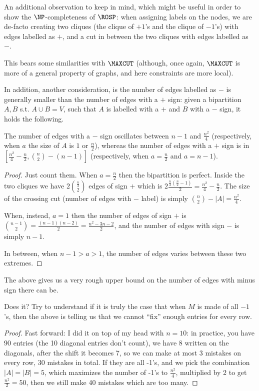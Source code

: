 An additional observation to keep in mind, which might be useful in order to show the $\NP$-completeness of $\ROSP$: when assigning labels on the nodes, we are de-facto creating two cliques (the clique of $+1$'s and the clique of $-1$'s) with edges labelled as $+$, and a cut in between the two cliques with edges labelled as $-$.

This bears some similarities with $\MAXCUT$ (although, once again, $\MAXCUT$ is more of a general property of graphs, and here constraints are more local).

In addition, another consideration, is the number of edges labelled as $-$ is generally smaller than the number of edges with a $+$ sign: given a bipartition $A,B$ s.t. $A\cup B=V$, such that $A$ is labelled with a $+$ and $B$ with a $-$ sign, it holds the following.

\begin{lemma}
\label{lemma:more_plus_than_minus_edges}
	The number of edges with a $-$ sign oscillates between $n-1$ and $\frac{n^2}{4}$ (respectively, when $a$ the size of $A$ is $1$ or $\frac{n}{2}$), whereas the number of edges with a $+$ sign is in $[\frac{n^2}{4}-\frac{n}{2}, {n \choose 2} - (n-1)]$ (respectively, when $a=\frac{n}{2}$ and $a=n-1$).
\end{lemma}
\begin{proof}
	Just count them. When $a= \frac{n}{2}$ then the bipartition is perfect. Inside the two cliques we have $2 {\frac{n}{2} \choose 2}$ edges of sign $+$ which is $2 \frac{\frac{n}{2}(\frac{n}{2}-1)}{2} = \frac{n^2}{4} - \frac{n}{2}$. The size of the crossing cut (number of edges with $-$ label) is simply ${n\choose 2}-|A|=\frac{n^2}{4}$.
	
	When, instead, $a=1$ then the number of edges of sign $+$ is ${n-1\choose 2} = \frac{(n-1)(n-2)}{2} = \frac{n^2-3n-2}{2}$, and the number of edges with sign $-$ is simply $n-1$.
	
	In between, when $n-1>a>1$, the number of edges varies between these two extremes.
\end{proof}

The above  gives us a very rough upper bound on the number of edges with minus sign there can be. 

\begin{question}
	Does it? Try to understand if it is truly the case that when $M$ is made of all $-1$'s, then the above  is telling us that we cannot ``fix'' enough entries for every row. 
\end{question}
\begin{proof}
	Fast forward: I did it on top of my head with $n=10$: in practice, you have 90 entries (the 10 diagonal entries don't count), we have $8$ written on the diagonals, after the shift it becomes 7, so we can make at most 3 mistakes on every row, 30 mistakes in total. If they are all -1's, and we pick the combination $|A|=|B|=5$, which maximizes the number of -1's to $\frac{n^2}{4}$, multiplied by 2 to get $\frac{n^2}{2}=50$, then we still make 40 mistakes which are too many.
\end{proof}

